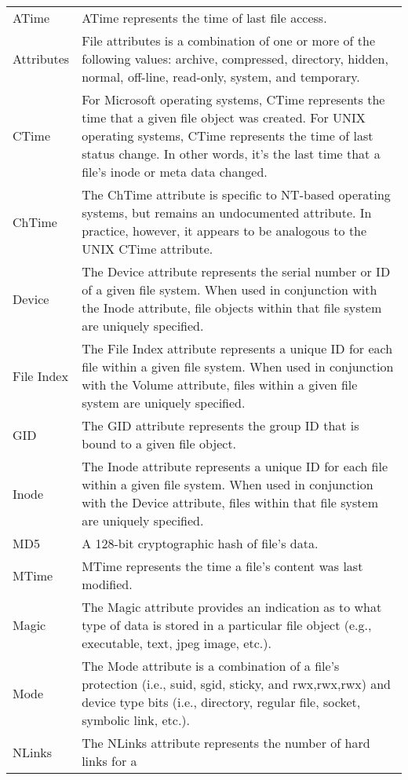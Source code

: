 \documentclass[10pt]{article}
\begin{document}
\begin{center}
\begin{supertabular}{lp{4.75in}}
ATime
&
ATime represents the time of last file access.
\\[.5em]
Attributes
&
File attributes is a combination of one or more of the following
values: archive, compressed, directory, hidden, normal, off-line,
read-only, system, and temporary.
\\[.5em]
CTime
&
For Microsoft operating systems, CTime represents the time that a
given file object was created.  For UNIX operating systems, CTime
represents the time of last status change.  In other words, it's
the last time that a file's inode or meta data changed.
\\[.5em]
ChTime
&
The ChTime attribute is specific to NT-based operating systems,
but remains an undocumented attribute.  In practice, however, it
appears to be analogous to the UNIX CTime attribute.
\\[.5em]
Device
&
The Device attribute represents the serial number or ID of a given
file system.  When used in conjunction with the Inode attribute,
file objects within that file system are uniquely specified.
\\[.5em]
File Index
&
The File Index attribute represents a unique ID for each file within
a given file system.  When used in conjunction with the Volume
attribute, files within a given file system are uniquely specified.
\\[.5em]
GID
&
The GID attribute represents the group ID that is bound to a given
file object.
\\[.5em]
Inode
&
The Inode attribute represents a unique ID for each file within a
given file system.  When used in conjunction with the Device
attribute, files within that file system are uniquely specified.
\\[.5em]
MD5
&
A 128-bit cryptographic hash of file's data.
\\[.5em]
MTime
&
MTime represents the time a file's content was last modified.
\\[.5em]
Magic
&
The Magic attribute provides an indication as to what type of data
is stored in a particular file object (e.g., executable, text, jpeg
image, etc.).
\\[.5em]
Mode
&
The Mode attribute is a combination of a file's protection (i.e.,
suid, sgid, sticky, and rwx,rwx,rwx) and device type bits (i.e.,
directory, regular file, socket, symbolic link, etc.).
\\[.5em]
NLinks
&
The NLinks attribute represents the number of hard links for a

\end{supertabular}
\end{center}
\end{document}

